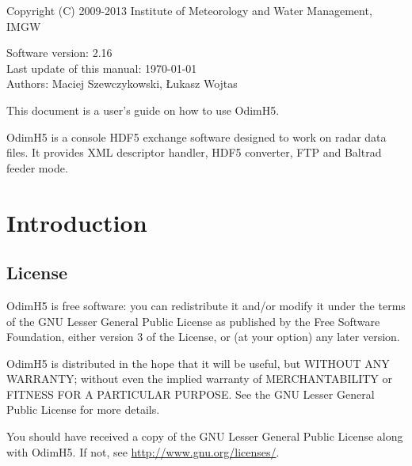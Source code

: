 \documentclass[11p]{article}
\begin{document}
\setlength{\fboxrule}{1pt}
\setlength{\fboxsep}{9pt}
\begin{flushleft}

\small
Copyright (C) 2009-2013 Institute of Meteorology and Water Management, IMGW\\
\vspace{.5cm}

\huge
{}
\end{flushleft}

\begin{center}
Software version: 2.16 \\
Last update of this manual: \today \\
Authors: Maciej Szewczykowski, Łukasz Wojtas\\
\end{center}

\begin{flushleft}

This document is a user's guide on how to use OdimH5.
\end{flushleft}

\vspace{1cm}
\small \noindent OdimH5 is a console HDF5 exchange software designed to work on
radar data files. It provides XML descriptor handler, HDF5 converter, FTP and
Baltrad feeder mode. \normalsize

\section{Introduction}

\subsection{License}

OdimH5 is free software: you can redistribute it and/or modify it under the
terms of the GNU Lesser General Public License as published by the Free Software
Foundation, either version 3 of the License, or (at your option) any later
version.

OdimH5 is distributed in the hope that it will be useful, but WITHOUT ANY
WARRANTY; without even the implied warranty of MERCHANTABILITY or FITNESS FOR A
PARTICULAR PURPOSE.  See the GNU Lesser General Public License for more details.

You should have received a copy of the GNU Lesser General Public License along
with OdimH5.  If not, see \href{http://www.gnu.org/licenses/}
{http://www.gnu.org/licenses/}.
\end{document}
